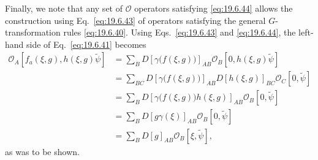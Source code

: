 Finally, we note that any set of $\mathcal O$ operators satisfying \eqref{eq:19.6.44} allows the construction using Eq.~\eqref{eq:19.6.43} of operators satisfying the general $G$-transformation rules \eqref{eq:19.6.40}. Using Eqs.~\eqref{eq:19.6.43} and \eqref{eq:19.6.44}, the left-hand side of Eq.~\eqref{eq:19.6.41} becomes
\[
\begin{aligned}
\mathcal O_A\left[
f_a(\xi,g),h(\xi,g)\widetilde\psi\right]
&=\sum_BD\left[\gamma\bigl(f(\xi,g)\bigr)\right]_{AB}
\mathcal O_B[0,h(\xi,g)\widetilde\psi]
\\
&=\sum_{BC}
D\left[\gamma\bigl(f(\xi,g)\bigr)\right]_{AB}
D[h(\xi,g)]_{BC}\mathcal O_C[0,\widetilde\psi]
\\
&=\sum_BD\left[
\gamma\bigl(f(\xi,g)\bigr)h(\xi,g)\right]_{AB}
\mathcal O_B[0,\widetilde\psi]
\\
&=\sum_BD[g\gamma(\xi)]_{AB}\mathcal O_B[0,\widetilde\psi]
\\
&=\sum_BD[g]_{AB}\mathcal O_B[\xi,\widetilde\psi],
\end{aligned}
\]
as was to be shown.

